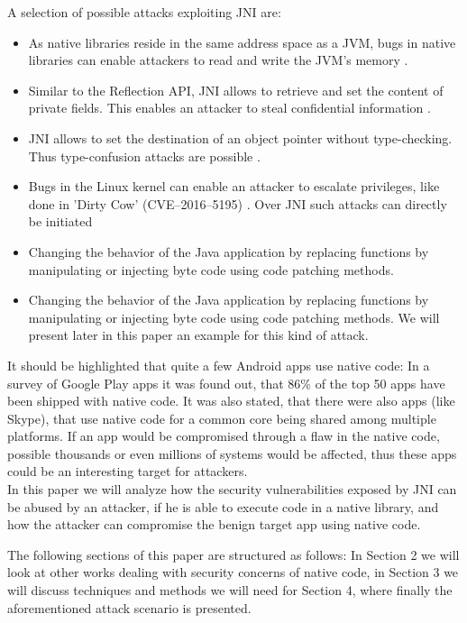A selection of possible attacks exploiting JNI are:
\begin{itemize}
\item As native libraries reside in the same address space as a JVM, bugs in native
libraries can enable attackers to read and write the JVM's memory \cite[p. 3]{Sun_jvm-portablesandboxing}. %
	\item  Similar to the Reflection API, JNI allows to retrieve and set the content of private fields. This enables an attacker to steal confidential information \cite[p. 3]{Sun_jvm-portablesandboxing}.
	\item JNI allows to set the destination of an object pointer without type-checking. Thus type-confusion attacks are possible \cite[p. 4]{Sun_jvm-portablesandboxing}. %
	\item Bugs in the Linux kernel can enable an attacker to escalate privileges, like done in 'Dirty Cow' (CVE--2016--5195) \cite{DirtyCow}. Over JNI such attacks can directly be initiated
    \item Changing the behavior of the Java application by replacing functions by manipulating or injecting byte code using code patching methods.
	\item Changing the behavior of the Java application by replacing functions by manipulating or injecting byte code using code patching methods.
	We will present later in this paper an example for this kind of attack.
\end{itemize}

It should be highlighted that quite a few Android apps use native code: In a survey of Google Play apps \cite[p. 3]{Sun:2014:NPA:2627393.2627396} it was found out, that 86\% of the top 50 apps have been shipped with native code. It was also stated, that there were also apps (like Skype), that use native code for a common core being shared among multiple platforms. If an app would be compromised through a flaw in the native code, possible thousands or even millions of systems would be affected, thus these apps could be an interesting target for attackers. \\

In this paper we will analyze how the security vulnerabilities exposed by JNI can be abused by an attacker, if he is able to execute code in a native library, and how the attacker can compromise the benign target app using native code.

The following sections of this paper are structured as follows: In Section 2 we will look at other works dealing with security concerns of native code, in Section 3 we will discuss techniques and methods we will need for Section 4, where finally the aforementioned attack scenario is presented. 

